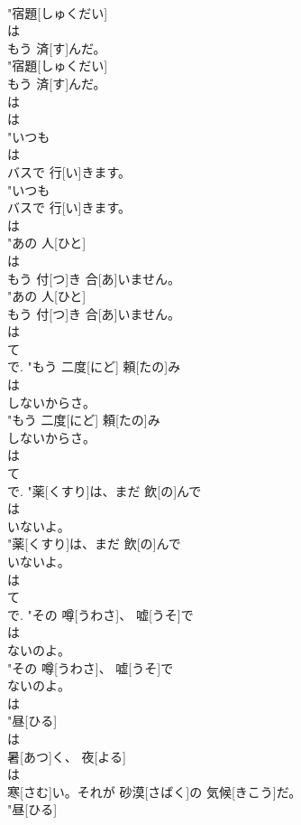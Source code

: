 \documentclass[8pt]{extreport}
\begin{document}
\begin{CJK}{UTF8}{min}
\\	"宿題[しゅくだい]
\\	は
\\	もう 済[す]んだ。
\\	"宿題[しゅくだい]
\\	もう 済[す]んだ。
\\	は 
\\	は
\\	"いつも
\\	は
\\	バスで 行[い]きます。
\\	"いつも
\\	バスで 行[い]きます。
\\	は
\\	"あの 人[ひと]
\\	は
\\	もう 付[つ]き 合[あ]いません。
\\	"あの 人[ひと]
\\	もう 付[つ]き 合[あ]いません。
\\	は
\\	て 
\\	で.	"もう 二度[にど] 頼[たの]み
\\	は
\\	しないからさ。
\\	"もう 二度[にど] 頼[たの]み
\\	しないからさ。
\\	は
\\	て 
\\	で.	"薬[くすり]は、まだ 飲[の]んで
\\	は
\\	いないよ。
\\	"薬[くすり]は、まだ 飲[の]んで
\\	いないよ。
\\	は
\\	て 
\\	で.	"その 噂[うわさ]、 嘘[うそ]で
\\	は
\\	ないのよ。
\\	"その 噂[うわさ]、 嘘[うそ]で
\\	ないのよ。
\\	は
\\	"昼[ひる]
\\	は
\\	暑[あつ]く、 夜[よる]
\\	は
\\	寒[さむ]い。それが 砂漠[さばく]の 気候[きこう]だ。
\\	"昼[ひる]

\end{CJK}
\end{document}
